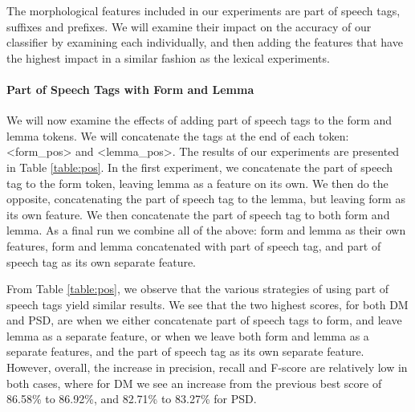 The morphological features included in our experiments are part of speech tags, suffixes and prefixes. We will examine their impact on the accuracy of our classifier by examining each individually, and then adding the features that have the highest impact in a similar fashion as the lexical experiments. 


\paragraph{Part of Speech Tags with Form and Lemma} We will now examine the effects of adding part of speech tags to the form and lemma tokens. We will concatenate the tags at the end of each token: <form\_pos> and <lemma\_pos>. The results of our experiments are presented in Table \ref{table:pos}. In the first experiment, we concatenate the part of speech tag to the form token, leaving lemma as a feature on its own. We then do the opposite, concatenating the part of speech tag to the lemma, but leaving form as its own feature. We then concatenate the part of speech tag to both form and lemma. As a final run we combine all of the above: form and lemma as their own features, form and lemma concatenated with part of speech tag, and part of speech tag as its own separate feature. 

From Table \ref{table:pos}, we observe that the various strategies of using part of speech tags yield similar results. We see that the two highest scores, for both DM and PSD, are when we either concatenate part of speech tags to form, and leave lemma as a separate feature, or when we leave both form and lemma as a separate features, and the part of speech tag as its own separate feature. However, overall, the increase in precision, recall and F-score are relatively low in both cases, where for DM we see an increase from the previous best score of 86.58\% to 86.92\%, and 82.71\% to 83.27\% for PSD.

